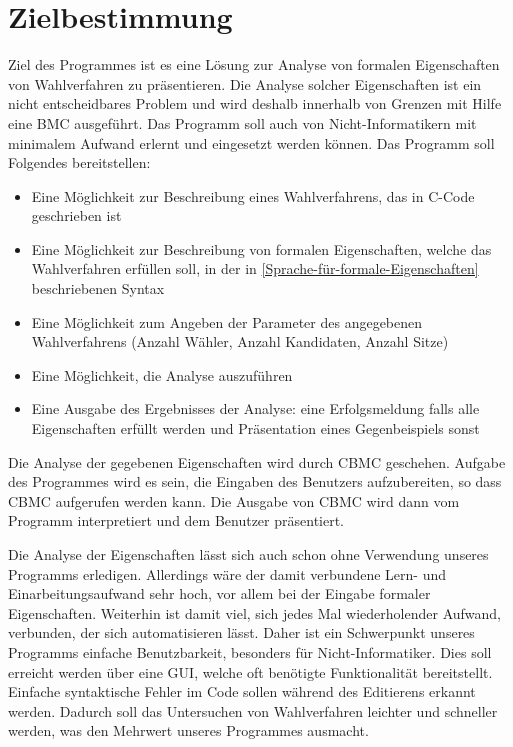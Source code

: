 \documentclass[a4paper]{scrreprt}
\begin{document}
\chapter{Zielbestimmung}
Ziel des Programmes ist es eine  Lösung zur Analyse von formalen Eigenschaften von Wahlverfahren zu präsentieren. Die Analyse solcher Eigenschaften ist ein nicht entscheidbares Problem und wird deshalb innerhalb von Grenzen mit Hilfe eine \ac{BMC} ausgeführt. Das Programm soll auch von Nicht-Informatikern mit minimalem Aufwand erlernt und eingesetzt werden können.
Das Programm soll Folgendes bereitstellen:
\begin{itemize}
\item Eine Möglichkeit zur Beschreibung eines Wahlverfahrens, das in C-Code geschrieben ist
\item Eine Möglichkeit zur Beschreibung von formalen Eigenschaften, welche das Wahlverfahren erfüllen soll, in der in \ref{Sprache-für-formale-Eigenschaften} beschriebenen Syntax 
\item Eine Möglichkeit zum Angeben der Parameter des angegebenen Wahlverfahrens (Anzahl Wähler, Anzahl Kandidaten, Anzahl Sitze)
\item Eine Möglichkeit, die Analyse auszuführen
\item Eine Ausgabe des Ergebnisses der Analyse: eine Erfolgsmeldung falls alle Eigenschaften erfüllt werden und Präsentation eines Gegenbeispiels sonst
\end{itemize}

Die Analyse der gegebenen Eigenschaften wird durch \ac{CBMC} geschehen. Aufgabe des Programmes wird es sein, die Eingaben des \gls{Benutzer}s aufzubereiten, so dass \ac{CBMC} aufgerufen werden kann. Die Ausgabe von \ac{CBMC} wird dann vom Programm interpretiert und dem Benutzer präsentiert. 

Die Analyse der Eigenschaften lässt sich auch schon ohne Verwendung unseres Programms erledigen. Allerdings wäre der damit verbundene Lern- und Einarbeitungsaufwand sehr hoch, vor allem bei der Eingabe formaler Eigenschaften. Weiterhin ist damit viel, sich jedes Mal wiederholender Aufwand, verbunden, der sich automatisieren lässt. Daher ist ein Schwerpunkt unseres Programms einfache Benutzbarkeit, besonders für Nicht-Informatiker. Dies soll erreicht werden über eine \ac{GUI}, welche oft benötigte Funktionalität bereitstellt. Einfache syntaktische Fehler im Code sollen während des Editierens erkannt werden. Dadurch soll das Untersuchen von Wahlverfahren leichter und schneller werden, was den Mehrwert unseres Programmes ausmacht.
\end{document}
